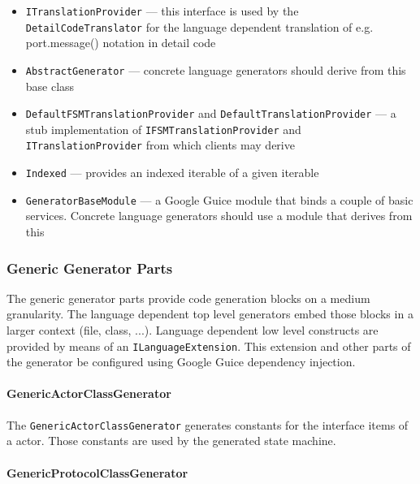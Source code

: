 \begin{itemize}
\item \begin{flushleft}\texttt{ITranslationProvider} --- this interface is used by the 
\texttt{DetailCodeTranslator} for the language dependent translation of e.g. port.message() notation in 
detail code\end{flushleft}
\item \texttt{AbstractGenerator} --- concrete language generators should derive from this base class
\item \begin{flushleft}\texttt{DefaultFSMTranslationProvider} and \texttt{DefaultTranslationProvider} --- a stub implementation of 
\texttt{IFSMTranslationProvider} and \texttt{ITranslationProvider} from which clients may derive\end{flushleft}
\item \texttt{Indexed} --- provides an indexed iterable of a given iterable
\item \texttt{GeneratorBaseModule} --- a Google Guice module that binds a couple of basic services. 
Concrete language generators should use a module that derives from this
\end{itemize}

\subsubsection{Generic Generator Parts}

The generic generator parts provide code generation blocks on a medium granularity. The language dependent 
top level generators embed those blocks in a larger context (file, class, ...). Language dependent low 
level constructs are provided by means of an \texttt{ILanguageExtension}. This extension and other parts 
of the generator be configured using Google Guice dependency injection.

\paragraph{GenericActorClassGenerator}

The \texttt{GenericActorClassGenerator} generates constants for the interface items of a actor. Those 
constants are used by the generated state machine.

\paragraph{GenericProtocolClassGenerator}

